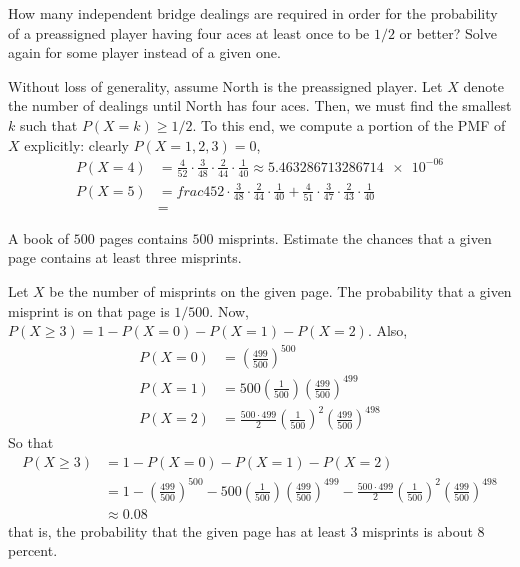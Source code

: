 \begin{problem}[Handout 8, \# 12]
  How many independent bridge dealings are required in order for the
  probability of a preassigned player having four aces at least once to be
  \(1/2\) or better? Solve again for some player instead of a given one.
\end{problem}
\begin{solution}
  Without loss of generality, assume North is the preassigned player. Let
  \(X\) denote the number of dealings until North has four aces. Then, we
  must find the smallest \(k\) such that \(P(X=k)\geq 1/2\). To this end,
  we compute a portion of the PMF of \(X\) explicitly: clearly
  \(P(X=1,2,3)=0\),
  \begin{align*}
    P(X=4)&=\frac{4}{52}\cdot\frac{3}{48}
            \cdot\frac{2}{44}\cdot\frac{1}{40}\approx\num{5.463286713286714e-06}\\
    P(X=5)&=frac{4}{52}\cdot\frac{3}{48}
            \cdot\frac{2}{44}\cdot\frac{1}{40}
            +\frac{4}{51}\cdot\frac{3}{47}\cdot\frac{2}{43}\cdot\frac{1}{40}\\
          &=
  \end{align*}
\end{solution}
\newpage

\begin{problem}[Handout 8, \# 13]
  A book of \(500\) pages contains \(500\) misprints. Estimate the chances
  that a given page contains at least three misprints.
\end{problem}
\begin{solution}
  Let $X$ be the number of misprints on the given page. The probability
  that a given misprint is on that page is $1/500$. Now,
  $P(X \geq 3) = 1- P(X=0) - P(X=1) - P(X=2)$. Also,
  \begin{align*}
    P(X=0) &= \left(\frac{499}{500}\right)^{500}\\
    P(X=1) &= 500\left(\frac{1}{500}\right)\left(\frac{499}{500}\right)^{499} \\
    P(X=2) &= \frac{500 \cdot 499}{2}\left(\frac{1}{500}\right)^2\left(\frac{499}{500}\right)^{498}
  \end{align*}
  So that
  \begin{align*}
    P(X \geq 3) &= 1- P(X=0) - P(X=1) - P(X=2)\\
                &= 1- \left(\frac{499}{500}\right)^{500} - 500\left(\frac{1}{500}\right)\left(\frac{499}{500}\right)^{499} - \frac{500 \cdot 499}{2}\left(\frac{1}{500}\right)^2\left(\frac{499}{500}\right)^{498}\\
                &\approx 0.08
  \end{align*}
  that is, the probability that the given page has at least \(3\) misprints
  is about \(8\) percent.
\end{solution}

